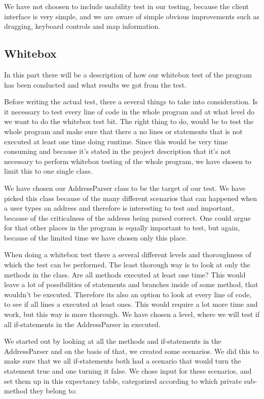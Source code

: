 \documentclass[a4paper,10pt,titlepage]{article}
\begin{document}
We have not choosen to include usability test in our testing, because the client interface is very simple, and we are aware of simple obvious improvements such as dragging, keyboard controls and map information.

	
		
		\subsection{Whitebox}		
			In this part there will be a description of how our whitebox test of the program has been conducted and what results we got from the test. 

Before writing the actual test, there a several things to take into consideration. Is it necessary to test every line of code in the whole program and at what level do we want to do the whitebox test bit. The right thing to do, would be to test the whole program and make sure that there a no lines or statements that is not executed at least one time doing runtime. Since this would be very time consuming and because it's stated in the project description that it's not necessary to perform whitebox testing of the whole program, we have chosen to limit this to one single class.  

We have chosen our AddressParser class to be the target of our test. We have picked this class because of the many different scenarios that can happened when a user types an address and therefore is interesting to test and important, because of the criticalness of the address being parsed correct. One could argue for that other places in the program is equally important to test, but again, because of the limited time we have chosen only this place. 

When doing a whitebox test there a several different levels and thoroughness of which the test can be performed. The least thorough way is to look at only the methods in the class. Are all methods executed at least one time? This would leave a lot of possibilities of statements and branches inside of some method, that wouldn't be executed. Therefore its also an option to look at every line of code, to see if all lines a executed at least ones. This would require a lot more time and work, but this way is more thorough. We have chosen a level, where we will test if all if-statements in the AddressParser in executed. 

We started out by looking at all the methods and if-statements in the AddressParser and on the basis of that, we created some scenarios. We did this to make sure that we all if-statements both had a scenario that would turn the statement true and one turning it false. We chose input for these scenarios, and set them up in this expectancy table, categorized according to which private sub-method they belong to:
\end{document}
